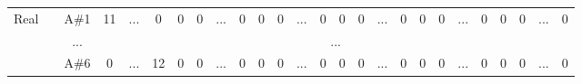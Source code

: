 \documentclass[12pt]{article}
\begin{document}
\begin{table}[!ht]
{\begin{tabular}{clcccccccccccccccccccccccc}
			\multirow{25}{*}{Real} 	& \multicolumn{1}{l|}{} & \multicolumn{1}{c|}{A\#1} & \multicolumn{1}{c|}{11}   & \multicolumn{1}{c|}{...}                  & \multicolumn{1}{c|}{0}    & \multicolumn{1}{c|}{0}    & \multicolumn{1}{c|}{0}  & \multicolumn{1}{c|}{...}                  & \multicolumn{1}{c|}{0}  & \multicolumn{1}{c|}{0}  & \multicolumn{1}{c|}{0}  & \multicolumn{1}{c|}{...}                  & \multicolumn{1}{c|}{0}    & \multicolumn{1}{c|}{0}    & \multicolumn{1}{c|}{0}    & \multicolumn{1}{c|}{...}                  & \multicolumn{1}{c|}{0}  & \multicolumn{1}{c|}{0}  & \multicolumn{1}{c|}{0}    & \multicolumn{1}{c|}{...}                  & \multicolumn{1}{c|}{0}    & \multicolumn{1}{c|}{0}    & \multicolumn{1}{c|}{0}  & \multicolumn{1}{c|}{...}                  & \multicolumn{1}{c|}{0}  \\ \cline{3-4} \cline{6-8} \cline{10-12} \cline{14-16} \cline{18-20} \cline{22-24} \cline{26-26} 
									& \multicolumn{1}{l|}{} & \multicolumn{1}{c|}{...}  & \multicolumn{23}{c|}{...}                                                                                                                                                                                                                                                                                                                                                                                                                                                                                                                                                                                                                                                                                                                         \\ \cline{3-4} \cline{6-8} \cline{10-12} \cline{14-16} \cline{18-20} \cline{22-24} \cline{26-26} 
									& \multicolumn{1}{l|}{} & \multicolumn{1}{c|}{A\#6} & \multicolumn{1}{c|}{0}    & \multicolumn{1}{c|}{\multirow{3}{*}{...}} & \multicolumn{1}{c|}{12}   & \multicolumn{1}{c|}{0}    & \multicolumn{1}{c|}{0}  & \multicolumn{1}{c|}{\multirow{3}{*}{...}} & \multicolumn{1}{c|}{0}  & \multicolumn{1}{c|}{0}  & \multicolumn{1}{c|}{0}  & \multicolumn{1}{c|}{\multirow{3}{*}{...}} & \multicolumn{1}{c|}{0}    & \multicolumn{1}{c|}{0}    & \multicolumn{1}{c|}{0}    & \multicolumn{1}{c|}{\multirow{3}{*}{...}} & \multicolumn{1}{c|}{0}  & \multicolumn{1}{c|}{0}  & \multicolumn{1}{c|}{0}    & \multicolumn{1}{c|}{\multirow{3}{*}{...}} & \multicolumn{1}{c|}{0}    & \multicolumn{1}{c|}{0}    & \multicolumn{1}{c|}{0}  & \multicolumn{1}{c|}{\multirow{3}{*}{...}} & \multicolumn{1}{c|}{0}  \\ \cline{3-4} \cline{6-8} \cline{10-12} \cline{14-16} \cline{18-20} \cline{22-24} \cline{26-26} 

\end{tabular}}
\end{table}
\end{document}
